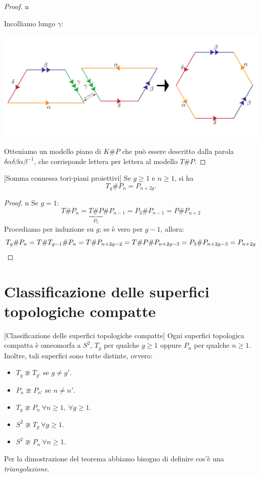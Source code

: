 \begin{proof}{n}
\begin{center}
\end{center}
Incolliamo lungo $\gamma$:
\begin{center}
	\includegraphics[trim=0cm 0cm 0cm 0cm, clip, scale=0.3]{images/kleinplusproj2.pdf}
\end{center}
Otteniamo un modello piano di $K\# P$ che può essere descritto dalla parola $\delta \alpha \delta\beta\alpha\beta^{-1}$, che corrisponde lettera per lettera al modello $T\# P$.\qedhere
\end{proof}
\begin{corollary}{}[Somma connessa tori-piani proiettivi]\label{toropiupiano}
Se $g\geq 1$ e $n\geq 1$, si ha
\begin{equation*}
	T_g\# P_n=P_{n+2g}.
\end{equation*}
\end{corollary}
\begin{proof}{n}
	Se $g=1$:
	\begin{equation*}
		T\# P_n=\underbrace{T\# P}_{P_3}\# P_{n-1}=P_3\# P_{n-1}=P\# P_{n+2}
	\end{equation*}
Procediamo per induzione su $g$; se è vero per $g-1$, allora:
\begin{equation*}
	T_g\# P_n=T\# T_{g-1}\# P_n=T\# P_{n+2g-2}=T\# P\# P_{n+2g-3}=P_3\# P_{n+2g-3}=P_{n+2g}\qedhere
\end{equation*}
\end{proof}
\section{Classificazione delle superfici topologiche compatte}
\begin{theorem}{}[Classificazione delle superfici topologiche compatte]\label{classificazionesuperficicompatte}
Ogni superfici topologica compatta è omeomorfa a $S^2$, $T_g$ per qualche $g\geq 1$ oppure $P_n$ per qualche $n\geq 1$. Inoltre, tali superfici sono tutte distinte, ovvero:
\begin{itemize}
	\item $T_g\ncong T_{g'}$ se $g\neq g'$.
	\item $P_n\ncong P_{n'}$ se $n\neq n'$.
	\item $T_g\ncong P_{n}\ \forall n\geq 1,\ \forall g\geq 1$.
	\item $S^2\ncong T_g\ \forall g\geq 1$.
	\item $S^2\ncong P_n\ \forall n\geq 1$.
\end{itemize}
\end{theorem}
Per la dimostrazione del teorema abbiamo bisogno di definire cos'è una \textit{triangolazione}.
